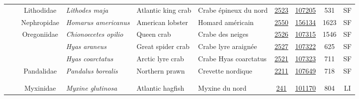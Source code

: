 \documentclass[12pt]{article}\usepackage[]{graphicx}\usepackage[]{color}
\begin{document}
\begin{landscapepage}
\begin{longtable}[t]{ccc>{\centering\arraybackslash}p{3cm}>{\centering\arraybackslash}p{3cm}>{\centering\arraybackslash}p{3cm}>{}c>{}ccc}
\hspace{1em}\hspace{1em} &  & Lithodidae & \em{Lithodes maja} & Atlantic king crab & Crabe épineux du nord & \href{#sec:2523}{2523} & \href{http://www.marinespecies.org/aphia.php?p=taxdetails&id=107205}{107205} & 531 & SF\\
\hspace{1em}\hspace{1em} &  & Nephropidae & \em{Homarus americanus} & American lobster & Homard américain & \href{#sec:2550}{2550} & \href{http://www.marinespecies.org/aphia.php?p=taxdetails&id=156134}{156134} & 1623 & SF\\
\hspace{1em}\hspace{1em} &  & Oregoniidae & \em{Chionoecetes opilio} & Queen crab & Crabe des neiges & \href{#sec:2526}{2526} & \href{http://www.marinespecies.org/aphia.php?p=taxdetails&id=107315}{107315} & 1546 & SF\\
\hspace{1em}\hspace{1em} &  &  & \em{Hyas araneus} & Great spider crab & Crabe lyre araignée & \href{#sec:2527}{2527} & \href{http://www.marinespecies.org/aphia.php?p=taxdetails&id=107322}{107322} & 625 & SF\\
\hspace{1em}\hspace{1em} &  &  & \em{Hyas coarctatus} & Arctic lyre crab & Crabe Hyas coarctatus & \href{#sec:2521}{2521} & \href{http://www.marinespecies.org/aphia.php?p=taxdetails&id=107323}{107323} & 711 & SF\\
\hspace{1em}\hspace{1em} &  & Pandalidae & \em{Pandalus borealis} & Northern prawn & Crevette nordique & \href{#sec:2211}{2211} & \href{http://www.marinespecies.org/aphia.php?p=taxdetails&id=107649}{107649} & 718 & SF\\
\addlinespace[0.3em]
\\
\addlinespace[0.3em]
\\
\hspace{1em}\hspace{1em} &  & Myxinidae & \em{Myxine glutinosa} & Atlantic hagfish & Myxine du nord & \href{#sec:241}{241} & \href{http://www.marinespecies.org/aphia.php?p=taxdetails&id=101170}{101170} & 804 & LI\\

\end{longtable}
\end{landscapepage}
\end{document}
